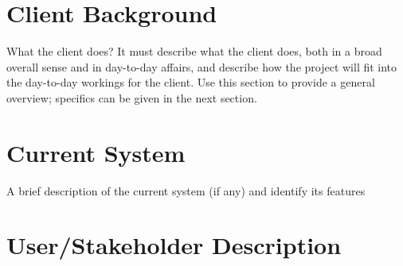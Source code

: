 \section{Client Background}
What the client does? It must describe what the client does, both in a broad overall sense and in day-to-day affairs, and describe how the project will fit into the day-to-day workings for the client. Use this section to provide a general overview; specifics can be given in the next section.

\section{Current System}
A brief description of the current system (if any) and identify its features

\section{User/Stakeholder Description}
